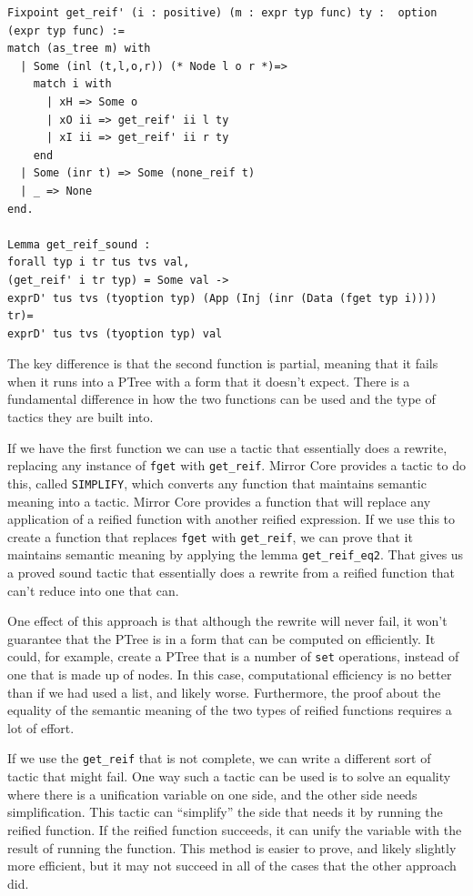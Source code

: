 \documentclass{puthesis}
\begin{document}
\begin{lstlisting}
Fixpoint get_reif' (i : positive) (m : expr typ func) ty :  option (expr typ func) :=
match (as_tree m) with
  | Some (inl (t,l,o,r)) (* Node l o r *)=>
    match i with 
      | xH => Some o
      | xO ii => get_reif' ii l ty 
      | xI ii => get_reif' ii r ty 
    end
  | Some (inr t) => Some (none_reif t)
  | _ => None
end.

Lemma get_reif_sound :
forall typ i tr tus tvs val,
(get_reif' i tr typ) = Some val ->
exprD' tus tvs (tyoption typ) (App (Inj (inr (Data (fget typ i)))) tr)= 
exprD' tus tvs (tyoption typ) val
\end{lstlisting}

The key difference is that the second function is partial, meaning
that it fails when it runs into a PTree with a form that it doesn't
expect. There is a fundamental difference in how the two functions can
be used and the type of tactics they are built into.

If we have the first function we can use a tactic that essentially
does a rewrite, replacing any instance of \lstinline|fget| with
\lstinline|get_reif|. Mirror Core provides a tactic to do this, called
\lstinline|SIMPLIFY|, which converts any function that maintains
semantic meaning into a tactic. Mirror Core provides a function that
will replace any application of a reified function with another
reified expression. If we use this to create a function that replaces
\lstinline|fget| with \lstinline|get_reif|, we can prove that it
maintains semantic meaning by applying the lemma
\lstinline|get_reif_eq2|. That gives us a proved sound tactic that
essentially does a rewrite from a reified function that can't reduce
into one that can. 

One effect of this approach is that although the rewrite will never
fail, it won't guarantee that the PTree is in a form that can be
computed on efficiently. It could, for example, create a PTree that is
a number of \lstinline|set| operations, instead of one that is made up
of nodes. In this case, computational efficiency is no better than if
we had used a list, and likely worse. Furthermore, the proof about the
equality of the semantic meaning of the two types of reified functions
requires a lot of effort.

If we use the \lstinline|get_reif| that is not complete, we can write a
different sort of tactic that might fail. One way such a tactic can be
used is to solve an equality where there is a unification variable on
one side, and the other side needs simplification. This tactic can
``simplify'' the side that needs it by running the reified
function. If the reified function succeeds, it can unify the variable
with the result of running the function. This method is easier to
prove, and likely slightly more efficient, but it may not succeed in
all of the cases that the other approach did.
\end{document}
